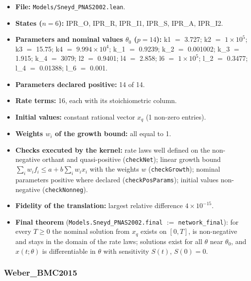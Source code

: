 \begin{itemize}\itemsep0pt\small
\item \textbf{File:} \texttt{Models/Sneyd\_PNAS2002.lean}.
\item \textbf{States ($n=6$):} IPR\_O, IPR\_R, IPR\_I1, IPR\_S, IPR\_A, IPR\_I2.
\item \textbf{Parameters and nominal values $\theta_0$ ($p=14$):} k1 $=$ 3.727; k2 $=$ $1\times10^{5}$; k3 $=$ 15.75; k4 $=$ $9.994\times10^{4}$; k\_1 $=$ 0.9239; k\_2 $=$ 0.001002; k\_3 $=$ 1.915; k\_4 $=$ 3079; l2 $=$ 0.9401; l4 $=$ 2.858; l6 $=$ $1\times10^{5}$; l\_2 $=$ 0.3477; l\_4 $=$ 0.01388; l\_6 $=$ 0.001.
\item \textbf{Parameters declared positive:} 14 of 14.
\item \textbf{Rate terms:} 16, each with its stoichiometric column.
\item \textbf{Initial values:} constant rational vector $x_q$ (1 non-zero entries).
\item \textbf{Weights $w_i$ of the growth bound:} all equal to 1.
\item \textbf{Checks executed by the kernel:} rate laws well defined on the non-negative orthant and quasi-positive (\texttt{checkNet}); linear growth bound $\sum_iw_if_i\le a+b\sum_iw_ix_i$ with the weights $w$ (\texttt{checkGrowth}); nominal parameters positive where declared (\texttt{checkPosParams}); initial values non-negative (\texttt{checkNonneg}).
\item \textbf{Fidelity of the translation:} largest relative difference $4\times10^{-15}$.
\item \textbf{Final theorem} (\texttt{Models.Sneyd\_PNAS2002.final} $:=$ \texttt{network\_final}): for every $T\ge0$ the nominal solution from $x_q$ exists on $[0,T]$, is non-negative and stays in the domain of the rate laws; solutions exist for all $\theta$ near $\theta_0$, and $x(t;\theta)$ is differentiable in $\theta$ with sensitivity $S(t)$, $S(0)=0$.
\end{itemize}

\subsubsection*{Weber\_BMC2015}

